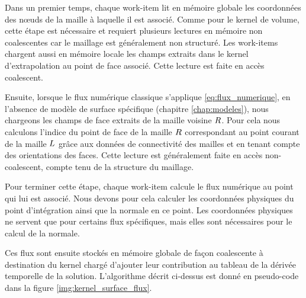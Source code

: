 Dans un premier temps, chaque work-item lit en mémoire globale les coordonnées
des nœuds de la maille à laquelle il est associé.
Comme pour le kernel de volume, cette étape est nécessaire
et requiert plusieurs lectures en mémoire non coalescentes car le maillage
est généralement non structuré.
Les work-items chargent aussi en mémoire locale
les champs extraits dans le kernel d'extrapolation au point de face
associé. Cette lecture est faite en accès coalescent.

Ensuite, lorsque le flux numérique classique s'applique
\eqref{eq:flux_numerique}, en l'absence
de modèle de surface spécifique (chapitre \ref{chap:modeles}),
nous chargeons les champs de face extraits de la maille voisine $R$.
Pour cela nous calculons l'indice du point de face de la maille $R$
correspondant au point courant de la maille $L$ grâce aux données
de connectivité des mailles et en tenant compte des orientations des faces.
Cette lecture est généralement faite en accès non-coalescent, compte tenu
de la structure du maillage.

Pour terminer cette étape, chaque work-item calcule le flux numérique
au point qui lui est associé. Nous devons pour cela calculer les
coordonnées physiques du point d’intégration ainsi que la normale
en ce point.
Les coordonnées physiques ne servent que pour certains flux spécifiques,
mais elles sont nécessaires pour le calcul de la normale.

Ces flux sont ensuite stockés en mémoire globale de façon coalescente
à destination du kernel chargé d'ajouter leur contribution au tableau
de la dérivée temporelle de la solution.
L’algorithme décrit ci-dessus est donné en pseudo-code dans la figure
\ref{img:kernel_surface_flux}.

